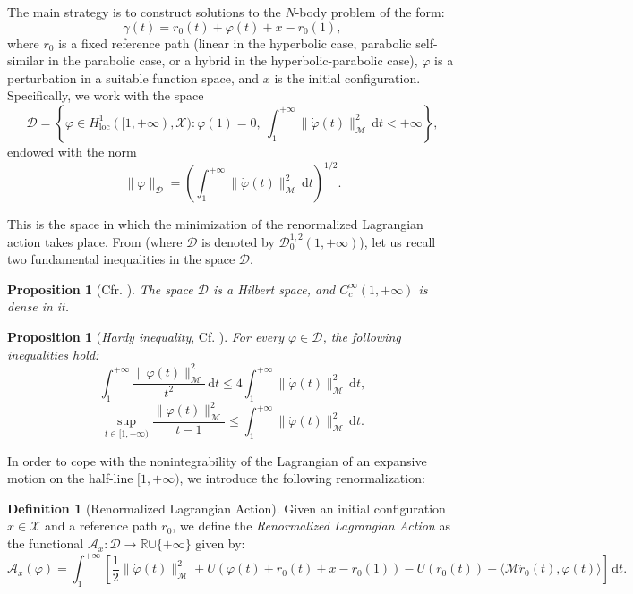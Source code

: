 \documentclass[a4paper,10pt]{amsart}
\theoremstyle{plain}
\newtheorem{prop}[thm]{Proposition}
\theoremstyle{definition}
\newtheorem{defn}[thm]{Definition}
\numberwithin{equation}{section}
\numberwithin{thm}{section}
\begin{document}
The main strategy is to construct solutions to the $N$-body problem of the form:
\[
    \gamma(t) = r_0(t) + \varphi(t) + x - r_0(1),
\]
where $r_0$ is a fixed reference path (linear in the hyperbolic case, parabolic self-similar in the parabolic case, or a hybrid in the hyperbolic-parabolic case), $\varphi$ is a perturbation in a suitable function space, and $x$ is the initial configuration. Specifically, we work with the space
\begin{displaymath}\label{eq:space}
 \mathcal D=
    \left\{ \varphi \in H^1_{\mathrm{loc}}([1, +\infty), \mathcal{X}) : \varphi(1) = 0,\ \int_1^{+\infty} \|\dot{\varphi}(t)\|_\mathcal{M}^2\, \mathrm{d}t < +\infty \right\},
\end{displaymath}
endowed with the norm
\[
    \|\varphi\|_{\mathcal{D}} = \left( \int_1^{+\infty} \|\dot{\varphi}(t)\|_\mathcal{M}^2\, \mathrm{d}t \right)^{1/2}.
\]

This is the space in which the minimization of the renormalized Lagrangian action takes place. {From \cite{BDFT} (where $\mathcal D$ is denoted by $\mathcal{D}_0^{1,2}(1, +\infty)$),} let us recall two fundamental inequalities in the space $\mathcal D$.

\begin{prop}[Cfr. \cite{BDFT}]
The space $\mathcal D$ is a Hilbert space, and $C_c^\infty(1, +\infty)$ is dense in it.
\end{prop}

\begin{prop}[\textit{Hardy inequality}, Cf. \cite{BDFT}]\label{dis_hardy}
For every $\varphi \in \mathcal{D}$, the following inequalities hold:
\begin{displaymath}
    \int_1^{+\infty} \frac{\|\varphi(t)\|_\mathcal{M}^2}{t^2}\, \mathrm{d}t \leq 4 \int_1^{+\infty} \|\dot{\varphi}(t)\|_\mathcal{M}^2\, \mathrm{d}t,
\end{displaymath}
\begin{equation}\label{dis_space_D012}
    \sup_{t \in [1, +\infty)} \frac{\|\varphi(t)\|_\mathcal{M}^2}{t - 1} \leq \int_1^{+\infty} \|\dot{\varphi}(t)\|_\mathcal{M}^2\, \mathrm{d}t.
\end{equation}
\end{prop}

In order to cope with the nonintegrability of the Lagrangian of an expansive motion on the half-line $[1, +\infty)$, we introduce the following renormalization:

\begin{defn}[Renormalized Lagrangian Action]\label{def:ren_action}
Given an initial configuration $x \in \mathcal{X}$ and a reference path $r_0$, we define the \emph{Renormalized Lagrangian Action} as the functional $\mathcal{A}_x: \mathcal{D} \to \mathbb R{\cup\{+\infty\}}$ given by:
\begin{displaymath}\label{def:renormalized_action}
    \mathcal{A}_x(\varphi) = \int_1^{+\infty} \left[ \frac{1}{2} \|\dot{\varphi}(t)\|_\mathcal{M}^2 + U(\varphi(t) + r_0(t) + x - r_0(1)) - U(r_0(t)) - \langle \mathcal{M} \ddot{r}_0(t), \varphi(t) \rangle \right]\, \mathrm{d}t.
\end{displaymath}
\end{defn}
\end{document}
